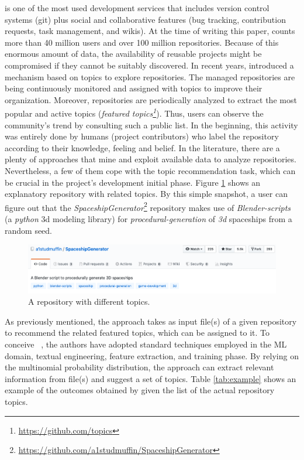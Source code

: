 \GH is one of the most used development services that includes version control 
systems (\ie git) plus social and collaborative features (\eg bug tracking, 
contribution requests, task management, and wikis).
At the time of writing this paper, \GH counts more than 40 million users and 
over 100 million repositories. Because of this enormous amount of data, the 
availability of reusable projects might be compromised if they cannot be 
suitably discovered. In recent years, \GH introduced a  mechanism based on 
topics to explore repositories. The managed \GH repositories are being continuously 
monitored and assigned with topics to improve their organization. Moreover, 
repositories are periodically analyzed to extract the most popular and active 
topics (\ie \emph{featured topics\footnote{\url{https://github.com/topics}}}). 
Thus, users can observe the community's trend by consulting such a public list. 
In the beginning, this activity was entirely done by humans (\ie project 
contributors) who label the repository according to their knowledge, feeling 
and belief. In the literature, there are a plenty of approaches that mine and exploit available 
data to analyze repositories. Nevertheless, a few of them cope with the topic 
recommendation task, which can be crucial in the project's development initial 
phase. Figure \ref{fig:SpaceshipGenerator} shows an explanatory repository with 
related topics. By this simple snapshot, a \GH user can figure out that the 
\emph{SpaceshipGenerator}\footnote{\label{note:spaceship}\url{https://github.com/a1studmuffin/SpaceshipGenerator}}
 repository makes use of \emph{Blender-scripts} (\ie a \emph{python} 3d 
modeling library) for \emph{procedural-generation} of \emph{3d} spaceships from 
a random seed.


\begin{figure}[h!]
    \centering
    \includegraphics[width=0.70\linewidth]{figs/SpaceshipGenerator.png}
    \caption{A \GH repository with different topics.}
    \label{fig:SpaceshipGenerator}
\end{figure}


As previously mentioned, the \MNB approach takes as input \RM file(s) of a given 
repository to recommend the related featured topics, which can be assigned to 
it. To conceive \MNB~\cite{10.1145/3383219.3383227}, the authors have adopted standard techniques employed in the 
ML domain, \ie textual engineering, feature extraction, and training phase. By 
relying on the multinomial probability distribution, the approach can extract 
relevant information from \RM file(s) and suggest a set of topics. Table 
\ref{tab:example} shows an example of the outcomes obtained by \MNB given the list of the actual repository topics. 

